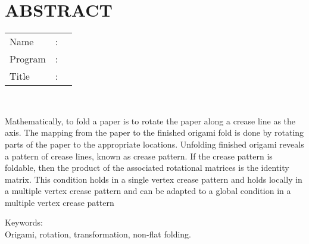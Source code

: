 %
%
%

\chapter*{\normalsize ABSTRACT}
\begin{singlespace}
\vspace*{0.2cm}

\noindent \begin{tabular}{l l p{11.0cm}}
	Name&: & \penulis \\ %
	Program&: & \programinggris \\ %
	Title&: & \judulInggris \\ %
\end{tabular} \\

\vspace*{0.5cm}

\noindent Mathematically, to fold a paper is to rotate the paper along a crease line as the axis. The mapping from the paper to the finished origami fold is done by rotating parts of the paper to the appropriate locations. Unfolding finished origami reveals a pattern of crease lines, known as crease pattern. If the crease pattern is foldable, then the product 
of the associated rotational matrices is the identity matrix. This condition holds in a single vertex crease pattern and holds locally in a multiple vertex crease pattern and can be adapted to a global condition in a multiple vertex crease pattern\\

\vspace*{0.2cm}

\noindent Keywords:\\
	Origami, rotation, transformation, non-flat folding.\\ %
\end{singlespace}

\newpage 